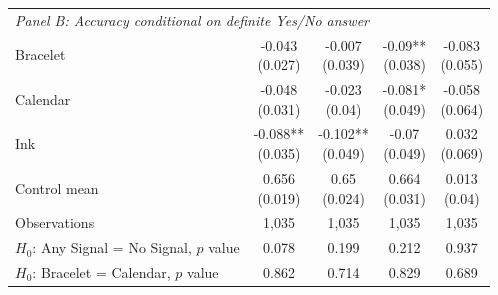 {\begin{tabular}[t]{lcccc}
\multicolumn{5}{l}{\textit{Panel B: Accuracy conditional on definite Yes/No answer}} \\
Bracelet & \makecell[c]{-0.043\\{(0.027)}} & \makecell[c]{-0.007\\{(0.039)}} & \makecell[c]{-0.09**\\{(0.038)}} & \makecell[c]{-0.083\\{(0.055)}}\\
Calendar & \makecell[c]{-0.048\\{(0.031)}} & \makecell[c]{-0.023\\{(0.04)}} & \makecell[c]{-0.081*\\{(0.049)}} & \makecell[c]{-0.058\\{(0.064)}}\\
Ink & \makecell[c]{-0.088**\\{(0.035)}} & \makecell[c]{-0.102**\\{(0.049)}} & \makecell[c]{-0.07\\{(0.049)}} & \makecell[c]{0.032\\{(0.069)}}\\
\midrule
Control mean & \makecell[c]{0.656\\{(0.019)}} & \makecell[c]{0.65\\{(0.024)}} & \makecell[c]{0.664\\{(0.031)}} & \makecell[c]{0.013\\{(0.04)}}\\
Observations & 1,035 & 1,035 & 1,035 & 1,035\\
\(H_0\): Any Signal = No Signal, \(p\) value & 0.078 & 0.199 & 0.212 & 0.937\\
\(H_0\): Bracelet = Calendar, \(p\) value & 0.862 & 0.714 & 0.829 & 0.689\\
\midrule


\end{tabular}}
